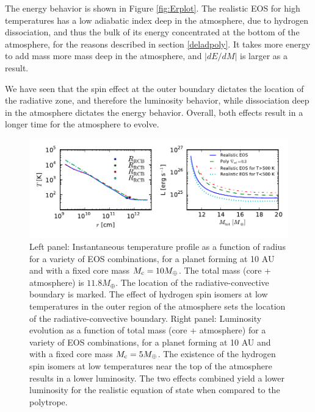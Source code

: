 \documentclass[apj]{emulateapj}
\newcommand{\delad}{\nabla_{\rm ad}}
\begin{document}
The energy behavior is shown in Figure \ref{fig:Erplot}. The realistic EOS for high temperatures has a low adiabatic index deep in the atmosphere, due to hydrogen dissociation, and thus the bulk of its energy concentrated at the bottom of the atmosphere, for the reasons described in section \ref{deladpoly}. It takes more energy to add mass more mass deep in the atmosphere, and $|dE/dM|$ is larger as a result. 
%

We have seen that the spin effect at the outer boundary dictates the location of the radiative zone, and therefore the luminosity behavior, while dissociation deep in the atmosphere dictates the energy behavior. Overall, both effects result in a longer time for the atmosphere to evolve. 


\begin{figure}[tb]
\centering
\includegraphics[width=\textwidth]{../../figs/ModelAtmospheres/RadSelfGravRealEOS/PaperFigs/TLr_plot.pdf}
\caption{Left panel: Instantaneous temperature profile as a function of radius for a variety of EOS combinations, for a planet forming at 10 AU and with a fixed core mass $M_{\rm c}=10 M_{\oplus}$. The total mass (core + atmosphere) is $11.8 M_{\oplus}$. The location of the radiative-convective boundary is marked. The effect of hydrogen spin isomers at low temperatures in the outer region of the atmosphere sets the location of the radiative-convective boundary.  Right panel: Luminosity evolution as a function of total mass (core + atmosphere) for a variety of EOS combinations, for a planet forming at 10 AU and with a fixed core mass $M_{\rm c}=5 M_{\oplus}$. The existence of the hydrogen spin isomers at low temperatures near the top of the atmosphere results in a lower luminosity. The two effects combined yield a lower luminosity for the realistic equation of state when compared to the polytrope. }
\label{fig:TLrplot}
\end{figure}
\end{document}
